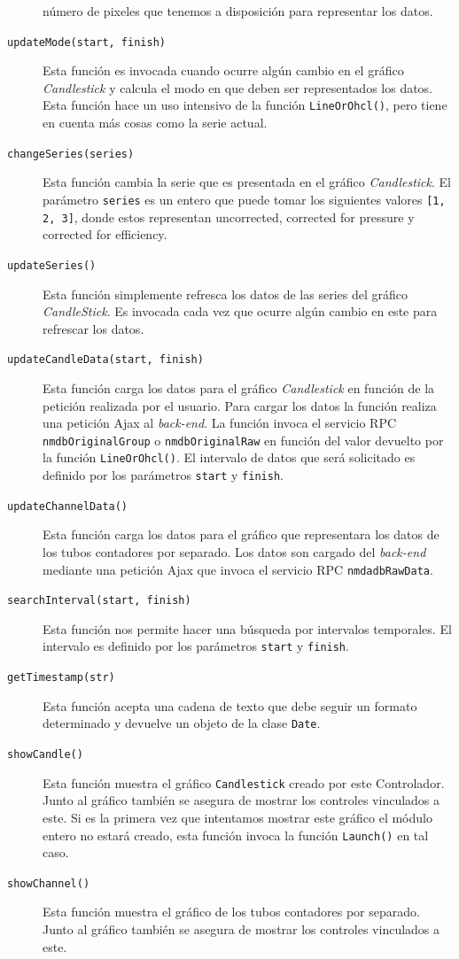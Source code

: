 \begin{description}
			  número de pixeles que tenemos a disposición para representar los datos.
			\item[\texttt{updateMode(start, finish)}] Esta función es invocada cuando ocurre algún cambio en el gráfico \emph{Candlestick}
			  y calcula el modo en que deben ser representados los datos. Esta función hace un uso intensivo de la función
			  \texttt{LineOrOhcl()}, pero tiene en cuenta más cosas como la serie actual.
			\item[\texttt{changeSeries(series)}] Esta función cambia la serie que es presentada en el gráfico \emph{Candlestick}. El
			  parámetro \texttt{series} es un entero que puede tomar los siguientes valores \texttt{[1, 2, 3]}, donde estos representan
			  uncorrected, corrected for pressure y corrected for efficiency.
			\item[\texttt{updateSeries()}] Esta función simplemente refresca los datos de las series del gráfico \emph{CandleStick}. Es
			  invocada cada vez que ocurre algún cambio en este para refrescar los datos.
			\item[\texttt{updateCandleData(start, finish)}] Esta función carga los datos para el gráfico \emph{Candlestick} en función de
			  la petición realizada por el usuario. Para cargar los datos la función realiza una petición Ajax al \emph{back-end}. La
			  función invoca el servicio RPC \texttt{nmdbOriginalGroup} o \texttt{nmdbOriginalRaw} en función del valor devuelto por la
			  función \texttt{LineOrOhcl()}. El intervalo de datos que será solicitado es definido por los parámetros \texttt{start} y
			  \texttt{finish}. 
			\item[\texttt{updateChannelData()}] Esta función carga los datos para el gráfico que representara los datos de los tubos
			  contadores por separado. Los datos son cargado del \emph{back-end} mediante una petición Ajax que invoca el servicio RPC
			  \texttt{nmdadbRawData}.
			\item[\texttt{searchInterval(start, finish)}] Esta función nos permite hacer una búsqueda por intervalos temporales. El
			  intervalo es definido por los parámetros \texttt{start} y \texttt{finish}.
			\item[\texttt{getTimestamp(str)}] Esta función acepta una cadena de texto que debe seguir un formato determinado y devuelve un
			  objeto de la clase \texttt{Date}. 
			\item[\texttt{showCandle()}] Esta función muestra el gráfico \texttt{Candlestick} creado por este Controlador. Junto al
			  gráfico también se asegura de mostrar los controles vinculados a este. Si es la primera vez que intentamos mostrar este
			  gráfico el módulo entero no estará creado, esta función invoca la función \texttt{Launch()} en tal caso.
			\item[\texttt{showChannel()}] Esta función muestra el gráfico de los tubos contadores por separado. Junto al gráfico también
			  se asegura de mostrar los controles vinculados a este.
		\end{description}
